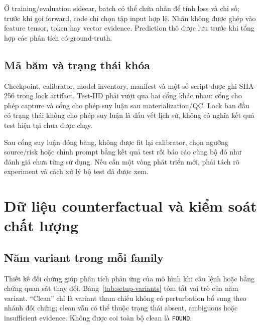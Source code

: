 Ở training/evaluation sidecar, batch có thể chứa nhãn để
tính loss và chỉ số; trước khi gọi forward, code chỉ chọn
tập input hợp lệ. Nhãn không được ghép vào feature tensor,
token hay vector evidence. Prediction thô được lưu trước
khi tổng hợp các phân tích có ground-truth.

\subsection{Mã băm và trạng thái khóa}

Checkpoint, calibrator, model inventory, manifest và một số
script được ghi SHA-256 trong lock artifact. Test-IID phải
vượt qua hai cổng khác nhau: cổng cho phép capture và cổng
cho phép suy luận sau materialization/QC. Lock ban đầu có
trạng thái không cho phép suy luận là dấu vết lịch sử,
không có nghĩa kết quả test hiện tại chưa được chạy.

Sau cổng suy luận đóng băng, không được fit lại calibrator,
chọn ngưỡng source/risk hoặc chỉnh prompt bằng kết quả test
rồi báo cáo cùng bộ đó như đánh giá chưa từng sử dụng.
Nếu cần một vòng phát triển mới, phải tách rõ experiment
và cách xử lý bộ test đã được xem.

\section{Dữ liệu counterfactual và kiểm soát chất lượng}
\label{sec:setup-counterfactual}

\subsection{Năm variant trong mỗi family}

Thiết kế đối chứng giúp phân tích phản ứng của mô hình khi
câu lệnh hoặc bằng chứng quan sát thay đổi. Bảng~\ref{tab:setup-variants}
tóm tắt vai trò của năm variant. “Clean” chỉ là variant tham chiếu
không có perturbation bổ sung theo nhánh đối chứng; clean vẫn có
thể thuộc trạng thái absent, ambiguous hoặc insufficient evidence.
Không được coi toàn bộ clean là \texttt{FOUND}.

